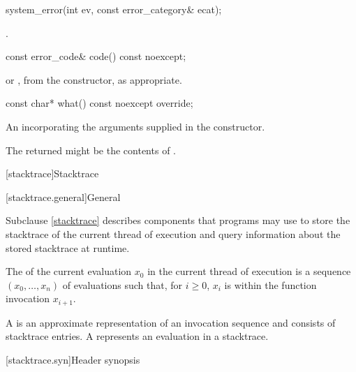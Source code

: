 %
\begin{itemdecl}
system_error(int ev, const error_category& ecat);
\end{itemdecl}

\begin{itemdescr}
\pnum
\ensures
{}.
\end{itemdescr}

%
\begin{itemdecl}
const error_code& code() const noexcept;
\end{itemdecl}

\begin{itemdescr}
\pnum
\returns
{} or , from the constructor,
as appropriate.
\end{itemdescr}

%
\begin{itemdecl}
const char* what() const noexcept override;
\end{itemdecl}

\begin{itemdescr}
\pnum
\returns
An \ntbs{} incorporating the arguments supplied in the constructor.

\begin{note}
The returned \ntbs{} might be the contents of .
\end{note}
\end{itemdescr}

[stacktrace]{Stacktrace}

[stacktrace.general]{General}

\pnum
Subclause \ref{stacktrace} describes components
that \Cpp{} programs may use to store
the stacktrace of the current thread of execution and
query information about the stored stacktrace at runtime.

\pnum
The  of the current evaluation $x_0$
in the current thread of execution
is a sequence $(x_0, \ldots, x_n)$ of evaluations such that, for $i \geq 0$,
$x_i$ is within the function invocation $x_{i+1}$.

\pnum
A  is an approximate representation of
an invocation sequence and consists of stacktrace entries.
A  represents an evaluation in a stacktrace.

[stacktrace.syn]{Header  synopsis}

